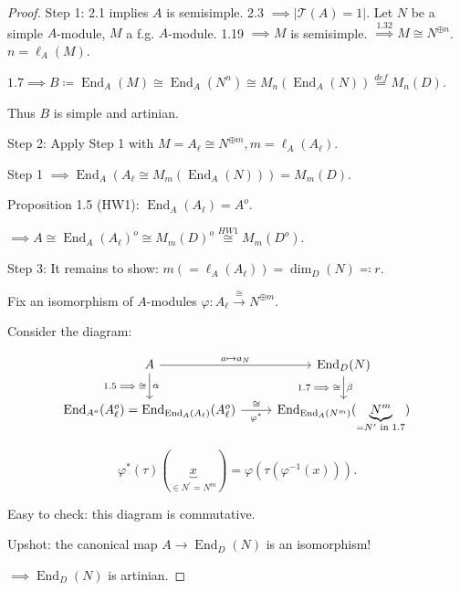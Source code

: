\documentclass{article}
\theoremstyle{definition}
\theoremstyle{plain}
\theoremstyle{remark}
\begin{document}
    \begin{proof}
        Step 1: 2.1 implies \(A\) is semisimple. 2.3 \(\implies \vert \mathcal{T} (A) = 1 \vert.\) Let \(N\) be a simple \(A\)-module, \(M\) a f.g. \(A\)-module. 1.19 \(\implies M\) is semisimple. \(\overset{1.32}{\implies} M \cong N^{\oplus n}\). \(n = \ell_A(M)\).

        \(1.7 \implies B \coloneqq \operatorname{End}_A(M) \cong \operatorname{End}_A(N^n) \cong M_n(\operatorname{End}_A(N)) \overset{def}{=} M_n(D)\).

        Thus \(B\) is simple and artinian.

        Step 2: Apply Step 1 with \(M = A_\ell \cong N^{\oplus m}, m = \ell_A(A_\ell)\).

        Step 1 \(\implies \operatorname{End}_A(A_\ell \cong M_m(\operatorname{End}_A(N))) = M_m(D)\).

        Proposition 1.5 (HW1): \(\operatorname{End}_A(A_\ell) = A^o\).

        \(\implies A\cong \operatorname{End}_A(A_\ell)^o \cong M_m(D)^o \overset{HW1}{\cong} M_m(D^o)\).
        
        Step 3: It remains to show: \(\boxed{m (= \ell_A(A_\ell)) = \dim_D (N) \eqqcolon r.}\)

        Fix an isomorphism of \(A\)-modules \(\varphi : A_\ell \xrightarrow{\cong}N^{\oplus m}\).

        Consider the diagram:

        \[
            \begin{tikzcd}
                A \ar[r,"a \mapsto a_N"] \ar[d,"\alpha","1.5\implies\cong"'] & \operatorname{End}_D(N) \ar[d,"\beta", "1.7 \implies \cong"'] \\ \operatorname{End}_{A^o}(A^o_\ell) = \operatorname{End}_{\operatorname{End}_A(A_\ell)}(A_\ell^o) \ar[r,"\cong","\varphi^{\ast}"'] & \operatorname{End}_{\operatorname{End}_A(N^m)}(\underbrace{N^m}_{=N^{\prime} \text{ in 1.7}})
            \end{tikzcd}
        \]

        \[
            \varphi^{\ast} (\tau)(\underbrace{x}_{\in N^{\prime} = N^m}) = \varphi (\tau (\varphi ^{-1} (x))).
        \]

        Easy to check: this diagram is commutative.

        Upshot: the canonical map \(A \to \operatorname{End}_D(N)\) is an isomorphism!

        \(\implies \operatorname{End}_D(N)\) is artinian.


\end{proof}
\end{document}
